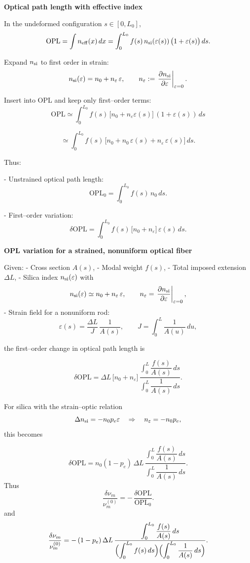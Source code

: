 \documentclass[aps,pra, onecolumn,superscriptaddress,nopacs,floatfix, showkeys, notitlepage]{revtex4-1}
\begin{document}

\textbf{Optical path length with effective index}

In the undeformed configuration $s \in [0,L_0]$,
\[
\mathrm{OPL}
= \int n_{\rm eff}(x)\,dx
= \int_0^{L_0} f(s)\,n_{\rm si}(\varepsilon(s))\,\bigl(1+\varepsilon(s)\bigr)\,ds.
\]

Expand $n_{\rm si}$ to first order in strain:
\[
n_{\rm si}(\varepsilon) = n_0 + n_\varepsilon\,\varepsilon,
\qquad
n_\varepsilon := \left.\frac{\partial n_{\rm si}}{\partial \varepsilon}\right|_{\varepsilon=0}.
\]

Insert into OPL and keep only first--order terms:
\[
\mathrm{OPL}
\simeq \int_0^{L_0}
f(s)\,\bigl[n_0 + n_\varepsilon \varepsilon(s)\bigr]\,(1+\varepsilon(s))\,ds
\]

\[
\simeq
\int_0^{L_0}
f(s)\,\bigl[n_0 + n_0\,\varepsilon(s) + n_\varepsilon\,\varepsilon(s)\bigr]\,ds.
\]

Thus:

- Unstrained optical path length:
\[
\mathrm{OPL}_0 = \int_0^{L_0} f(s)\,n_0\,ds.
\]

- First--order variation:
\[
\boxed{
\delta\mathrm{OPL}
= \int_0^{L_0} f(s)\,\bigl[n_0 + n_\varepsilon\bigr]\,\varepsilon(s)\,ds.
}
\]


\textbf{OPL variation for a strained, nonuniform optical fiber}

Given:
- Cross section $A(s)$,
- Modal weight $f(s)$,
- Total imposed extension $\Delta L$,
- Silica index $n_{\rm si}(\varepsilon)$ with
  \[
  n_{\rm si}(\varepsilon)
  \simeq n_0 + n_\varepsilon\,\varepsilon,
  \qquad
  n_\varepsilon = \left.\frac{\partial n_{\rm si}}{\partial \varepsilon}\right|_{\varepsilon=0},
  \]
- Strain field for a nonuniform rod:
  \[
  \varepsilon(s)
  = \frac{\Delta L}{J}\,\frac{1}{A(s)},
  \qquad
  J = \int_0^L \frac{1}{A(u)}\,du,
  \]

the first--order change in optical path length is

\[
\boxed{
\delta\mathrm{OPL}
= \Delta L\,
  \bigl[n_0 + n_\varepsilon\bigr]\,
  \frac{\displaystyle\int_0^L \dfrac{f(s)}{A(s)}\,ds}
       {\displaystyle\int_0^L \dfrac{1}{A(s)}\,ds}.
}
\]

For silica with the strain–optic relation
\[
\Delta n_{\rm si} = -n_0 p_e \varepsilon
\quad\Rightarrow\quad
n_\varepsilon = -n_0 p_e,
\]
this becomes

\[
\boxed{
\delta\mathrm{OPL}
= n_0(1 - p_e)\,\Delta L\,
  \frac{\displaystyle\int_0^L \dfrac{f(s)}{A(s)}\,ds}
       {\displaystyle\int_0^L \dfrac{1}{A(s)}\,ds}.
}
\]
Thus
\[
\frac{\delta\nu_m}{\nu_m^{(0)}} 
= -\,\frac{\delta\mathrm{OPL}}{\mathrm{OPL}_0}.
\]
and 
\[
\frac{\delta\nu_m}{\nu_m^{(0)}}
= -\,(1-p_e)\,\Delta L\,
\frac{\displaystyle\int_0^{L_0}\dfrac{f(s)}{A(s)}\,ds}
     {\displaystyle
       \Bigl(\int_0^{L_0} f(s)\,ds\Bigr)
       \Bigl(\int_0^{L_0}\dfrac{1}{A(s)}\,ds\Bigr)
     }.
\]
\end{document}
